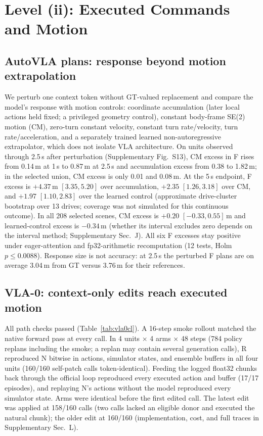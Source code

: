 \section{Level (ii): Executed Commands and Motion}
\subsection{AutoVLA plans: response beyond motion extrapolation}
We perturb one context token without GT-valued replacement and compare the model's response with motion controls: coordinate accumulation (later local actions held fixed; a privileged geometry control), constant body-frame SE(2) motion (CM), zero-turn constant velocity, constant turn rate/velocity, turn rate/acceleration, and a separately trained learned non-autoregressive extrapolator, which does not isolate VLA architecture. On units observed through 2.5\,s after perturbation (Supplementary Fig.~S13), CM excess in F rises from 0.14\,m at 1\,s to 0.87\,m at 2.5\,s and accumulation excess from 0.38 to 1.82\,m; in the selected union, CM excess is only 0.01 and 0.08\,m. At the 5\,s endpoint, F excess is $+4.37$\,m $[3.35,5.20]$ over accumulation, $+2.35$ $[1.26,3.18]$ over CM, and $+1.97$ $[1.10,2.83]$ over the learned control (approximate drive-cluster bootstrap over 13 drives; coverage was not simulated for this continuous outcome). In all 208 selected scenes, CM excess is $+0.20$ $[-0.33,0.55]$\,m and learned-control excess is $-0.34$\,m (whether its interval excludes zero depends on the interval method; Supplementary Sec.~J). All six F excesses stay positive under eager-attention and fp32-arithmetic recomputation (12 tests, Holm $p\le0.0088$). Response size is not accuracy: at 2.5\,s the perturbed F plans are on average 3.04\,m from GT versus 3.76\,m for their references.



\subsection{VLA-0: context-only edits reach executed motion}
\label{sec:vla0cl}
All path checks passed (Table~\ref{tab:vla0cl}). A 16-step smoke rollout matched the native forward pass at every call. In 4 units $\times$ 4 arms $\times$ 48 steps (784 policy replans including the smoke; a replan may contain several generation calls), R reproduced N bitwise in actions, simulator states, and ensemble buffers in all four units (160/160 self-patch calls token-identical). Feeding the logged float32 chunks back through the official loop reproduced every executed action and buffer (17/17 episodes), and replaying N's actions without the model reproduced every simulator state. Arms were identical before the first edited call. The latest edit was applied at 158/160 calls (two calls lacked an eligible donor and executed the natural chunk); the older edit at 160/160 (implementation, cost, and full traces in Supplementary Sec.~L).

